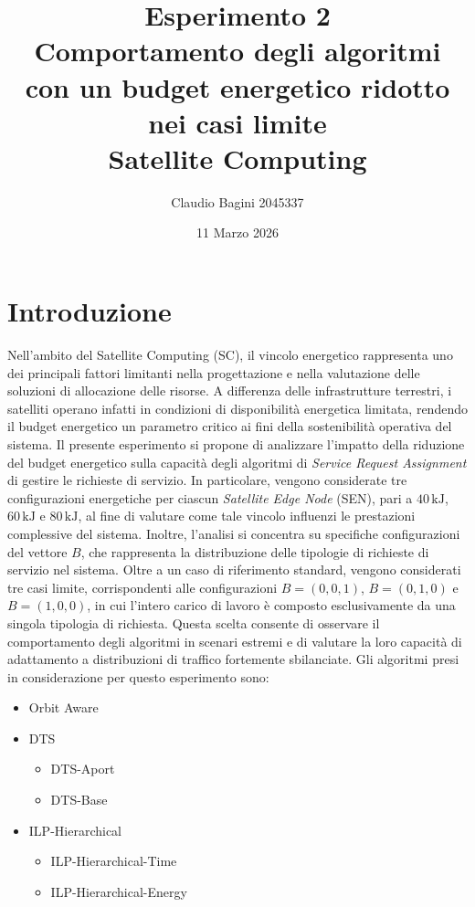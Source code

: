 \documentclass[12pt]{article}
\title{
\textbf{Esperimento 2} \\[0.5em]
\textbf{Comportamento degli algoritmi con un budget energetico ridotto nei casi limite} \\[1em]
Satellite Computing
}
\author{Claudio Bagini 2045337}
\date{11 Marzo 2026}
\begin{document}
\maketitle


\section{Introduzione}

Nell’ambito del Satellite Computing (SC), il vincolo energetico rappresenta uno dei principali fattori limitanti nella progettazione e nella valutazione delle soluzioni di allocazione delle risorse. A differenza delle infrastrutture terrestri, i satelliti operano infatti in condizioni di disponibilità energetica limitata, rendendo il budget energetico un parametro critico ai fini della sostenibilità operativa del sistema. Il presente esperimento si propone di analizzare l’impatto della riduzione del budget energetico sulla capacità degli algoritmi di \textit{Service Request Assignment} di gestire le richieste di servizio. In particolare, vengono considerate tre configurazioni energetiche per ciascun \textit{Satellite Edge Node} (SEN), pari a $40\,\mathrm{kJ}$, $60\,\mathrm{kJ}$ e $80\,\mathrm{kJ}$, al fine di valutare come tale vincolo influenzi le prestazioni complessive del sistema. Inoltre, l’analisi si concentra su specifiche configurazioni del vettore $B$, che rappresenta la distribuzione delle tipologie di richieste di servizio nel sistema. Oltre a un caso di riferimento standard, vengono considerati tre casi limite, corrispondenti alle configurazioni $B=(0,0,1)$, $B=(0,1,0)$ e $B=(1,0,0)$, in cui l’intero carico di lavoro è composto esclusivamente da una singola tipologia di richiesta. Questa scelta consente di osservare il comportamento degli algoritmi in scenari estremi e di valutare la loro capacità di adattamento a distribuzioni di traffico fortemente sbilanciate.
Gli algoritmi presi in considerazione per questo esperimento sono:

\begin{itemize}
    \item Orbit Aware
    \item DTS
        \begin{itemize}
            \item DTS-Aport
            \item DTS-Base
        \end{itemize}
    \item ILP-Hierarchical
        \begin{itemize}
            \item ILP-Hierarchical-Time
            \item ILP-Hierarchical-Energy
        \end{itemize}
        
\end{itemize}
\end{document}

